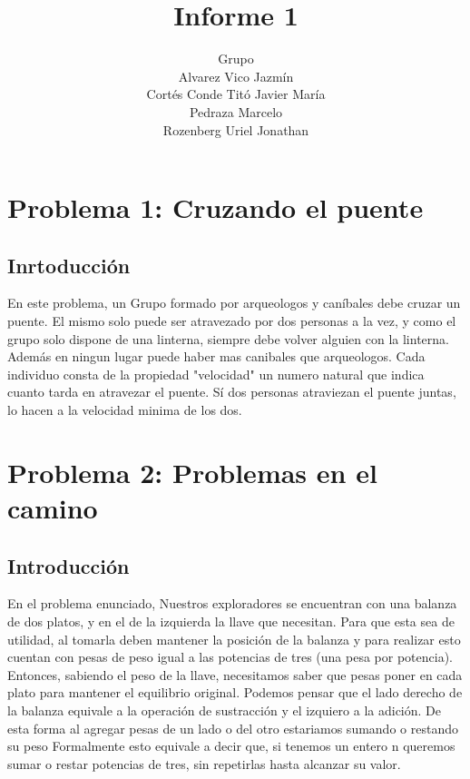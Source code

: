 \documentclass[spanish,12pt]{article}
\begin{document}
\title{Informe 1}

\author{Grupo  \\Alvarez Vico Jazm\'in\\Cortés Conde Titó Javier María\\Pedraza Marcelo \\ Rozenberg Uriel Jonathan}


\maketitle

\clearpage

\tableofcontents
\cleardoublepage

\section{Problema 1: Cruzando el puente}

\subsection{Inrtoducción}

En este problema, un Grupo formado por arqueologos y caníbales debe cruzar un puente. El mismo solo puede ser atravezado por dos personas a la vez, y como el grupo solo dispone de una linterna, siempre debe volver alguien con la linterna. Además en ningun lugar puede haber mas canibales que arqueologos.
Cada individuo consta de la propiedad "velocidad" un numero natural que indica cuanto tarda en atravezar el puente. Sí dos personas atraviezan el puente juntas, lo hacen a la velocidad minima de los dos.

\section{Problema 2: Problemas en el camino}

\subsection{Introducción}

En el problema enunciado, Nuestros exploradores se encuentran con una balanza de dos platos, y en el de la izquierda la llave que necesitan. Para que esta sea de utilidad, al tomarla deben mantener la posición de la balanza y para realizar esto cuentan con pesas de peso igual a las potencias de tres (una pesa por potencia).
Entonces, sabiendo el peso de la llave, necesitamos saber que pesas poner en cada plato para mantener el equilibrio original.
Podemos pensar que el lado derecho de la balanza equivale a la operación de sustracción y el izquiero a la adición. De esta forma al agregar pesas de un lado o del otro estariamos sumando o restando su peso
Formalmente esto equivale a decir que, si tenemos un entero n queremos sumar o restar potencias de tres, sin repetirlas hasta alcanzar su valor.
\end{document}
